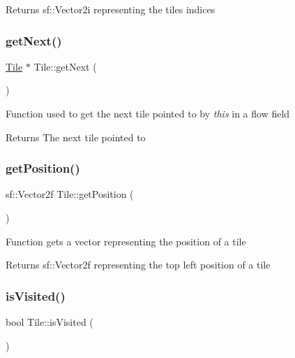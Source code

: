 \begin{DoxyReturn}{Returns}
sf\+::\+Vector2i representing the tile\textquotesingle{}s indices
\end{DoxyReturn}
\mbox{\label{class_tile_a43a4d61ae6e7e98c4a37ae525151a0e9}} 
\subsubsection{\texorpdfstring{getNext()}{getNext()}}
{\footnotesize\ttfamily \mbox{\hyperlink{class_tile}{Tile}} $\ast$ Tile\+::get\+Next (\begin{DoxyParamCaption}{ }\end{DoxyParamCaption})}



Function used to get the next tile pointed to by {\itshape this} in a flow field 

\begin{DoxyReturn}{Returns}
The next tile pointed to
\end{DoxyReturn}
\mbox{\label{class_tile_afd69da1519691d4f82bfe0534db4f01c}} 
\subsubsection{\texorpdfstring{getPosition()}{getPosition()}}
{\footnotesize\ttfamily sf\+::\+Vector2f Tile\+::get\+Position (\begin{DoxyParamCaption}{ }\end{DoxyParamCaption})}



Function gets a vector representing the position of a tile 

\begin{DoxyReturn}{Returns}
sf\+::\+Vector2f representing the top left position of a tile
\end{DoxyReturn}
\mbox{\label{class_tile_a980db52575b7707886daaf3fcb925bb7}} 
\subsubsection{\texorpdfstring{isVisited()}{isVisited()}}
{\footnotesize\ttfamily bool Tile\+::is\+Visited (\begin{DoxyParamCaption}{ }\end{DoxyParamCaption})}



